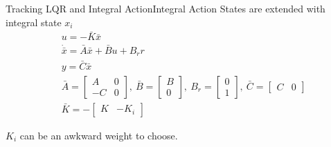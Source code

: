 \begin{frame}{Tracking LQR and Integral Action}{Integral Action}
	States are extended with integral state $x_i$
	\begin{align}\label{eq:ClassicalIntegralAction}
		&u = -\bar{K}\bar{x} \\
		&\dot{\bar{x}} = \bar{A}\bar{x} + \bar{B}u + B_r r \\ 
		&y = \bar{C}\bar{x}\\
		&\bar{A} = \begin{bmatrix}A & 0 \\ -C & 0 \end{bmatrix}, \ \bar{B} = \begin{bmatrix} B \\ 0 \end{bmatrix}, \ B_r = \begin{bmatrix} 0 \\ 1 \end{bmatrix}, \ \bar{C} = \begin{bmatrix} C & 0 \end{bmatrix}\\
		& \bar{K} = -\begin{bmatrix} K & -K_i \end{bmatrix}
	\end{align}

	$K_i$ can be an awkward weight to choose.
\end{frame}

